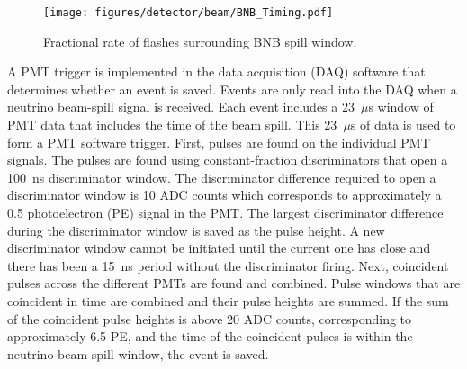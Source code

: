   \begin{figure}[h]
    \centering
    \texttt{[image: figures/detector/beam/BNB\_Timing.pdf]}
    \caption{Fractional rate of flashes surrounding BNB spill window.}
    \label{fig:bnbtiming}
  \end{figure}

  A PMT trigger is implemented in the data acquisition (DAQ) software that
  determines whether an event is saved. Events are only read into the DAQ
  when a neutrino beam-spill signal is received. Each event includes a
  23~$\mu$s window of PMT data that includes the time of the beam spill.
  This 23~$\mu$s of data is used to form a PMT software trigger. First,
  pulses are found on the individual PMT signals. The pulses are found using
  constant-fraction discriminators that open a 100~ns discriminator window.
  The discriminator difference required to open a discriminator window is 10
  ADC counts which corresponds to approximately a 0.5 photoelectron (PE)
  signal in the PMT. The largest discriminator difference during the
  discriminator window is saved as the pulse height. A new discriminator
  window cannot be initiated until the current one has close and there has
  been a 15~ns period without the discriminator firing.  Next, coincident
  pulses across the different PMTs are found and combined.  Pulse windows
  that are coincident in time are combined and their pulse heights are
  summed. If the sum of the coincident pulse heights is above 20 ADC counts,
  corresponding to approximately 6.5 PE, and the time of the coincident
  pulses is within the neutrino beam-spill window, the event is saved.



